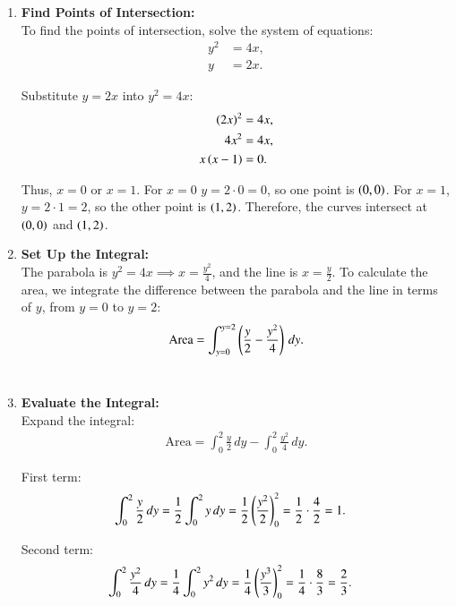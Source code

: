 \documentclass[journal]{IEEEtran}
\begin{document}
\begin{enumerate}
    \item \textbf{Find Points of Intersection:} \\  
    To find the points of intersection, solve the system of equations:  
    \begin{align}
        y^2 &= 4x, \\
        y &= 2x.
    \end{align}

    Substitute $y = 2x$ into $y^2 = 4x$:  
    \begin{align}
        \left(2x\right)^2 &= 4x, \\
        4x^2 &= 4x, \\
        x \left(x - 1\right) &= 0.
    \end{align}

    Thus, $x = 0$ or $x = 1$.  
    For $x = 0$ $y = 2 \cdot 0 = 0$, so one point is $\left(0, 0\right)$.  
    For $x = 1$, $y = 2 \cdot 1 = 2$, so the other point is $\left(1, 2\right)$.  
    Therefore, the curves intersect at $\left(0, 0\right)$ and $\left(1, 2\right)$. \\

    \item \textbf{Set Up the Integral:}  \\
    The parabola is $y^2 = 4x \implies x = \frac{y^2}{4}$, and the line is $x = \frac{y}{2}$.  
    To calculate the area, we integrate the difference between the parabola and the line in terms of $y$, from $y = 0$ to $y = 2$:
    \begin{align}
        \text{Area} = \int_{y=0}^{y=2} \left( \frac{y}{2} - \frac{y^2}{4} \right) \, dy.
    \end{align} \\

    \item \textbf{Evaluate the Integral:}  \\
    Expand the integral:
    \begin{align}
        \text{Area} = \int_{0}^{2} \frac{y}{2} \, dy - \int_{0}^{2} \frac{y^2}{4} \, dy.
    \end{align}

    First term:
    \begin{align}
        \int_{0}^{2} \frac{y}{2} \, dy &= \frac{1}{2} \int_{0}^{2} y \, dy = \frac{1}{2} \left( \frac{y^2}{2} \right)_{0}^{2} = \frac{1}{2} \cdot \frac{4}{2} = 1.
    \end{align}

    Second term:
    \begin{align}
        \int_{0}^{2} \frac{y^2}{4} \, dy &= \frac{1}{4} \int_{0}^{2} y^2 \, dy = \frac{1}{4} \left( \frac{y^3}{3} \right)_{0}^{2} = \frac{1}{4} \cdot \frac{8}{3} = \frac{2}{3}.
    \end{align}


\end{enumerate}
\end{document}
